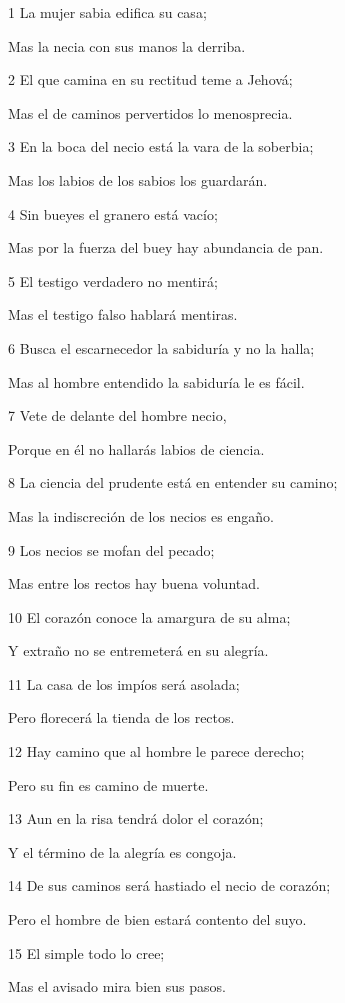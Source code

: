 \par 1 La mujer sabia edifica su casa;
\par Mas la necia con sus manos la derriba.
\par 2 El que camina en su rectitud teme a Jehová;
\par Mas el de caminos pervertidos lo menosprecia.
\par 3 En la boca del necio está la vara de la soberbia;
\par Mas los labios de los sabios los guardarán.
\par 4 Sin bueyes el granero está vacío;
\par Mas por la fuerza del buey hay abundancia de pan.
\par 5 El testigo verdadero no mentirá;
\par Mas el testigo falso hablará mentiras.
\par 6 Busca el escarnecedor la sabiduría y no la halla;
\par Mas al hombre entendido la sabiduría le es fácil.
\par 7 Vete de delante del hombre necio,
\par Porque en él no hallarás labios de ciencia.
\par 8 La ciencia del prudente está en entender su camino;
\par Mas la indiscreción de los necios es engaño.
\par 9 Los necios se mofan del pecado;
\par Mas entre los rectos hay buena voluntad.
\par 10 El corazón conoce la amargura de su alma;
\par Y extraño no se entremeterá en su alegría.
\par 11 La casa de los impíos será asolada;
\par Pero florecerá la tienda de los rectos.
\par 12 Hay camino que al hombre le parece derecho;
\par Pero su fin es camino de muerte. 
\par 13 Aun en la risa tendrá dolor el corazón;
\par Y el término de la alegría es congoja.
\par 14 De sus caminos será hastiado el necio de corazón;
\par Pero el hombre de bien estará contento del suyo.
\par 15 El simple todo lo cree;
\par Mas el avisado mira bien sus pasos.

